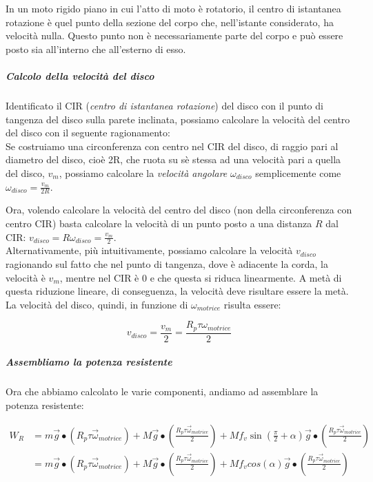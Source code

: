 \documentclass[main.tex]{subfiles}
\begin{document}
\begin{definition}
In un moto rigido piano in cui l'atto di moto è rotatorio, il centro di istantanea rotazione è quel punto della sezione del corpo che, nell'istante considerato, ha velocità nulla. Questo punto non è necessariamente parte del corpo e può essere posto sia all'interno che all'esterno di esso.
\end{definition}

\subparagraph{Calcolo della velocità del disco} Identificato il CIR (\textit{centro di istantanea rotazione}) del disco con il punto di tangenza del disco sulla parete inclinata, possiamo calcolare la velocità del centro del disco con il seguente ragionamento:
\\

Se costruiamo una circonferenza con centro nel CIR del disco, di raggio pari al diametro del disco, cioè 2R, che ruota su sè stessa ad una velocità pari a quella del disco, $v_m$, possiamo calcolare la \textit{velocità angolare} $\omega_{disco}$ semplicemente come $\omega_{disco}=\frac{v_m}{2R}$.

Ora, volendo calcolare la velocità del centro del disco (non della circonferenza con centro CIR) basta calcolare la velocità di un punto posto a una distanza $R$ dal CIR: $v_{disco} = R\omega_{disco} = \frac{v_m}{2}$.
\\

Alternativamente, più intuitivamente, possiamo calcolare la velocità $v_{disco}$ ragionando sul fatto che nel punto di tangenza, dove è adiacente la corda, la velocità è $v_m$, mentre nel CIR è 0 e che questa si riduca linearmente. A metà di questa riduzione lineare, di conseguenza, la velocità deve risultare essere la metà.
\\

La velocità del disco, quindi, in funzione di $\omega_{motrice}$ risulta essere:

\[
  v_{disco} = \frac{v_m}{2} = \frac{R_p\tau\omega_{motrice}}{2}
\]

\subparagraph{Assembliamo la potenza resistente} Ora che abbiamo calcolato le varie componenti, andiamo ad assemblare la potenza resistente:

\begin{align*}
  W_R &= m\vec{g}\bullet(R_p\tau\vec{\omega}_{motrice}) + M\vec{g}\bullet(\frac{R_p\tau\vec{\omega}_{motrice}}{2}) + Mf_v\sin(\frac{\pi}{2}+\alpha)\vec{g}\bullet(\frac{R_p\tau\vec{\omega}_{motrice}}{2})\\
  &= m\vec{g}\bullet(R_p\tau\vec{\omega}_{motrice}) + M\vec{g}\bullet(\frac{R_p\tau\vec{\omega}_{motrice}}{2}) + Mf_vcos(\alpha)\vec{g}\bullet(\frac{R_p\tau\vec{\omega}_{motrice}}{2})\\
\end{align*}
\end{document}
